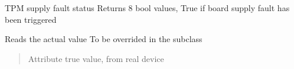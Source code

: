 \documentclass[letterpaper,10pt,english]{sphinxmanual}
\begin{document}
\begin{fulllineitems}
\label{\detokenize{webserverdocs:subrack_hardware.TpmSupplyFault}}
\pysigstartsignatures
{}
\pysigstopsignatures
\sphinxAtStartPar
TPM supply fault status
Returns 8 bool values, True if board supply fault has been triggered

\begin{fulllineitems}
\label{\detokenize{webserverdocs:subrack_hardware.TpmSupplyFault.read_value}}
\pysigstartsignatures
{}
\pysigstopsignatures
\sphinxAtStartPar
Reads the actual value
To be overrided in the subclass
\begin{quote}\begin{description}
\sphinxAtStartPar
Attribute true value, from real device

\end{description}\end{quote}

\end{fulllineitems}


\end{fulllineitems}

\end{document}
